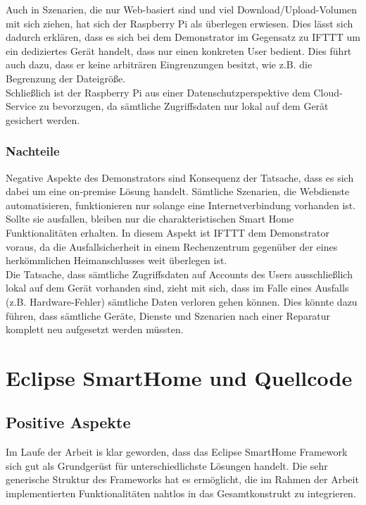 Auch in Szenarien, die nur Web-basiert sind und viel Download/Upload-Volumen mit sich ziehen, hat sich der Raspberry Pi als überlegen erwiesen. Dies lässt sich dadurch erklären, dass es sich bei dem Demonstrator im Gegensatz zu IFTTT um ein dediziertes Gerät handelt, dass nur einen konkreten User bedient. Dies führt auch dazu, dass er keine arbiträren Eingrenzungen besitzt, wie z.B. die Begrenzung der Dateigröße.\\

Schließlich ist der Raspberry Pi aus einer Datenschutzperspektive dem Cloud-Service zu bevorzugen, da sämtliche Zugriffsdaten nur lokal auf dem Gerät gesichert werden.

\subsubsection{Nachteile}
Negative Aspekte des Demonstrators sind Konsequenz der Tatsache, dass es sich dabei um eine on-premise Lösung handelt. Sämtliche Szenarien, die Webdienste automatisieren, funktionieren nur solange eine Internetverbindung  vorhanden ist. Sollte sie ausfallen, bleiben nur die charakteristischen Smart Home Funktionalitäten erhalten. In diesem Aspekt ist IFTTT dem Demonstrator voraus, da die Ausfallsicherheit in einem Rechenzentrum gegenüber der eines herkömmlichen Heimanschlusses weit überlegen ist.\\

Die Tatsache, dass sämtliche Zugriffsdaten auf Accounts des Users ausschließlich lokal auf dem Gerät vorhanden sind, zieht mit sich, dass im Falle eines Ausfalls (z.B. Hardware-Fehler) sämtliche Daten verloren gehen können. Dies könnte dazu führen, dass sämtliche Geräte, Dienste und Szenarien nach einer Reparatur komplett neu aufgesetzt werden müssten.



\section{Eclipse SmartHome und Quellcode}
\subsection{Positive Aspekte}
Im Laufe der Arbeit is klar geworden, dass das Eclipse SmartHome Framework sich gut als Grundgerüst für unterschiedlichste Lösungen handelt. Die sehr generische Struktur des Frameworks hat es ermöglicht, die im Rahmen der Arbeit implementierten Funktionalitäten nahtlos in das Gesamtkonstrukt zu integrieren. 

